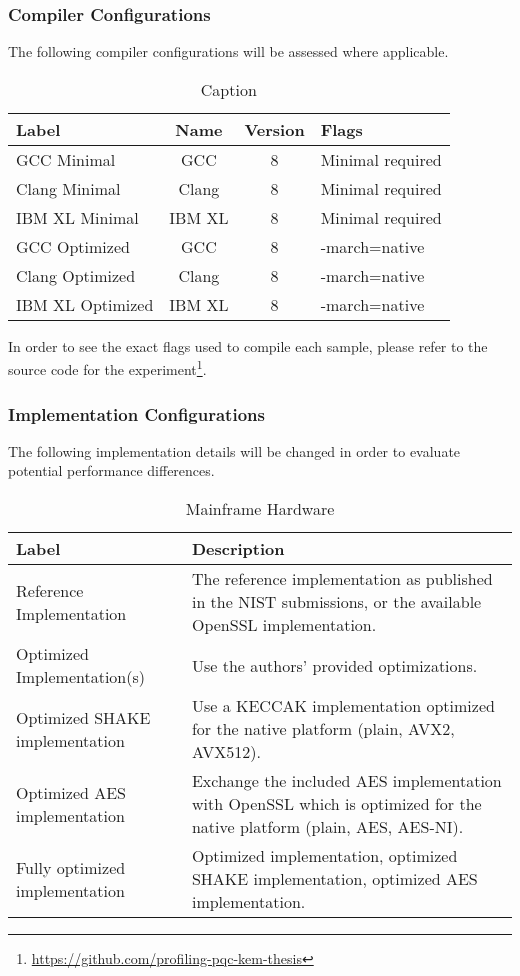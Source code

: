 \subsubsection{Compiler Configurations}

The following compiler configurations will be assessed where applicable.

\begin{table}[]
    \centering
    \begin{tabular}{l|c|c|p{4cm}}
        Label & Name & Version & Flags \\
        \hline
        GCC Minimal & GCC & 8 & Minimal required\\
        Clang Minimal & Clang & 8 & Minimal required\\
        IBM XL Minimal & IBM XL & 8 & Minimal required\\
        GCC Optimized & GCC & 8 & -march=native\\
        Clang Optimized & Clang & 8 & -march=native\\
        IBM XL Optimized & IBM XL & 8 & -march=native\\
    \end{tabular}
    \caption{Caption}
    \label{table:method:compilers}
\end{table}

In order to see the exact flags used to compile each sample, please refer to the source code for the experiment\footnote{\href{https://github.com/profiling-pqc-kem-thesis}{https://github.com/profiling-pqc-kem-thesis}}.

\subsubsection{Implementation Configurations}

The following implementation details will be changed in order to evaluate potential performance differences.

\begin{table}[H]
    \centering
    \begin{tabular}{l|p{6cm}}
        Label & Description\\
        \hline
        Reference Implementation & The reference implementation as published in the NIST submissions, or the available OpenSSL implementation. \\
        Optimized Implementation(s) & Use the authors' provided optimizations.\\
        Optimized SHAKE implementation & Use a KECCAK implementation optimized for the native platform (plain, AVX2, AVX512).\\
        Optimized AES implementation & Exchange the included AES implementation with OpenSSL which is optimized for the native platform (plain, AES, AES-NI).\\
        Fully optimized implementation & Optimized implementation, optimized SHAKE implementation, optimized AES implementation.\\
    \end{tabular}
    \caption{Mainframe Hardware}
    \label{table:method:mainframe-hardware}
\end{table}

